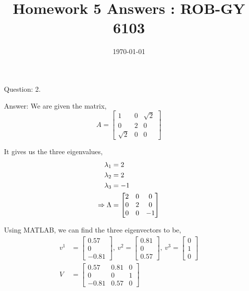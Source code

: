 \documentclass[a4paper]{article}
\title{Homework 5 Answers : ROB-GY 6103}
\author{\myName}
\date{\today}
\newcommand{\myName}{\textbf{Shantanu Ghodgaonkar}\\\textit{Univ ID}: N11344563\\\textit{Net ID}: sng8399\\\textit{Ph.No.}: +1 (929) 922-0614}
\begin{document}
	
	
	\begin{qalist}			
		\item[Question: 2.] \setcounter{equation}{0}
		\item[Answer:] We are given the matrix, 
			\begin{equation}
				A = \begin{bmatrix}1 & 0 & \sqrt{2} \\ 0 & 2 & 0 \\ \sqrt{2} & 0 & 0\end{bmatrix}
			\end{equation}
			
			It gives us the three eigenvalues, 
			 \begin{align}
				 {\lambda}_{1} &= 2 \notag \\ {\lambda}_{2} &= 2 \\ {\lambda}_{3} &= -1 \notag \\ \Rightarrow \Lambda &= \begin{bmatrix} 2 & 0 & 0\\ 0 & 2 & 0 \\ 0 & 0 & -1 \end{bmatrix}
			\end{align} 
			
			Using MATLAB, we can find the three eigenvectors to be, 
			\begin{align}
				{v}^{1} &= \begin{bmatrix}  0.57 \\ 0 \\ -0.81 \end{bmatrix} ,~{v}^{2} = \begin{bmatrix}  0.81 \\ 0 \\ 0.57 \end{bmatrix}  ,~{v}^{3} = \begin{bmatrix}  0 \\ 1 \\ 0 \end{bmatrix}\\ 
				V &=  \begin{bmatrix} 0.57 & 0.81 & 0 \\ 0 & 0 & 1 \\ -0.81 & 0.57 & 0 \end{bmatrix}
			\end{align}
			

\end{qalist}
\end{document}
